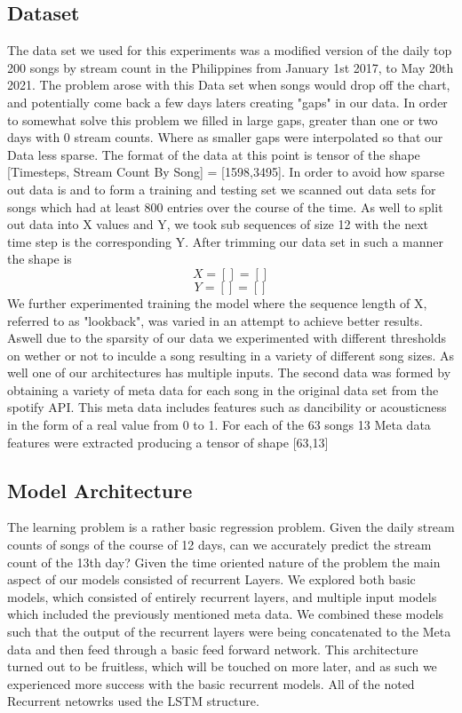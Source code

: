 \documentclass[11pt]{article}
\begin{document}
\subsection{Dataset}
The data set we used for this experiments was a modified version of the daily top 200 songs by stream count in the Philippines  from January 1st 2017, to May 20th 2021. The problem arose with this Data set when songs would drop off the chart, and potentially come back a few days laters creating "gaps" in our data. In order to somewhat solve this problem we filled in large gaps, greater than one or two days with 0 stream counts. Where as smaller gaps were interpolated so that our Data less sparse. The format of the data at this point is tensor of the shape [Timesteps, Stream Count By Song] = [1598,3495]. In order to avoid how sparse out data is and to form a training and testing set we scanned out data sets for songs which had at least 800 entries over the course of the time. As well to split out data into X values and Y, we took sub sequences of size 12 with the next time step is the corresponding Y. After trimming our data set in such a manner the shape is 
\[X = [\text{}] = []\]
\[Y = [\text{}] = []\]
We further experimented training the model where the sequence length of X, referred to as "lookback", was varied in an attempt to achieve better results. Aswell due to the sparsity of our data we experimented with different thresholds on wether or not to inculde a song resulting in a variety of different song sizes. 
As well one of our architectures has multiple inputs. The second data was formed by obtaining a variety of meta data for each song in the original data set from the spotify API. This meta data includes features such as dancibility or acousticness in the form of a real value from 0 to 1. For each of the 63 songs 13 Meta data features were extracted producing a tensor of shape [63,13]

\subsection{Model Architecture}
The learning problem is a rather basic regression problem. Given the daily stream counts of songs of the course of 12 days, can we accurately predict the stream count of the 13th day? Given the time oriented nature of the problem the main aspect of our models consisted of recurrent Layers. We explored both basic models, which consisted of entirely recurrent layers, and multiple input models which included the previously mentioned meta data. We combined these models such that the output of the recurrent layers were being concatenated to the Meta data and then feed through a basic feed forward network. This architecture turned out to be fruitless, which will be touched on more later, and as such we experienced more success with the basic recurrent models. All of the noted Recurrent netowrks used the LSTM structure.
\end{document}
